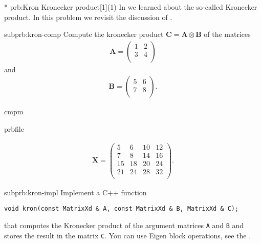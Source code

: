 \renewcommand{\ProblemName}{Kronecker}

\begin{samproblem}*
  {prb:Kron}
  {Kronecker product}[1](1)
  {
    In  we learned about the so-called Kronecker product.
    In this problem we revisit the
    discussion of .
  }

\begin{subproblem}{subprb:kron-comp}
  Compute the kronecker product
  $\mathbf{C} = \mathbf{A} \otimes \mathbf{B}$ of the matrices
\begin{align*}
  \mathbf{A} = \begin{pmatrix}
         1 & 2   \\
         3 & 4   \\
       \end{pmatrix}
\end{align*}
and
\begin{align*}
\mathbf{B}=\begin{pmatrix}
         5 & 6   \\
         7 & 8   \\
       \end{pmatrix}.
\end{align*}

\begin{samwriteprbpart}{cmpm}
  \begin{writeverbatim}{prbfile}
    \begin{samsolution}
      \begin{align*}
\mathbf{X}=\begin{pmatrix}
         5 & 6 & 10 & 12  \\
         7 & 8 & 14 & 16  \\
         15 & 18 & 20 & 24  \\
         21 & 24 & 28 & 32  \\
       \end{pmatrix}.
        \end{align*}
      \end{samsolution}
    \end{writeverbatim}
  \end{samwriteprbpart}
\end{subproblem}

\begin{subproblem}{subprb:kron-impl}
Implement a C++ function
\begin{lstlisting}[style=cppsimple]
void kron(const MatrixXd & A, const MatrixXd & B, MatrixXd & C);
\end{lstlisting}
that computes the Kronecker product of the argument matrices
\texttt{A} and \texttt{B} and stores the result in the matrix \texttt{C}.
You can use Eigen block operations, see the .


\end{subproblem}
\end{samproblem}
